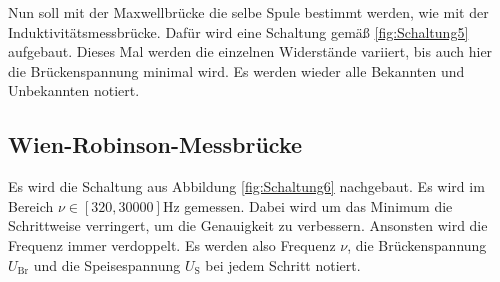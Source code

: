 Nun soll mit der Maxwellbrücke die selbe Spule bestimmt werden, wie mit der Induktivitätsmessbrücke.
Dafür wird eine Schaltung gemäß \ref{fig:Schaltung5} aufgebaut.
Dieses Mal werden die einzelnen Widerstände variiert, bis auch hier die 
Brückenspannung minimal wird.
Es werden wieder alle Bekannten und Unbekannten notiert.

\subsection{Wien-Robinson-Messbrücke}

Es wird die Schaltung aus Abbildung \ref{fig:Schaltung6} nachgebaut.
Es wird im Bereich $\nu \in \left[ 320, 30000 \right] \si\hertz $ gemessen.
Dabei wird um das Minimum die Schrittweise verringert, um die Genauigkeit zu verbessern.
Ansonsten wird die Frequenz immer verdoppelt.
Es werden also Frequenz $\nu$, die Brückenspannung $U_\text{Br}$ und die Speisespannung $U_\text{S}$
bei jedem Schritt notiert.